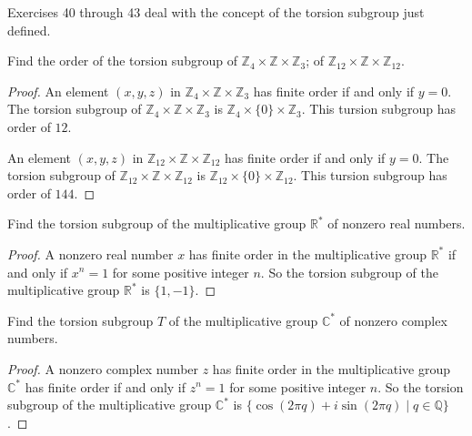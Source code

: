Exercises 40 through 43 deal with the concept of the torsion subgroup just defined.

\begin{exercise}
    Find the order of the torsion subgroup of $\mathbb{Z}_{4} \times \mathbb{Z} \times \mathbb{Z}_{3}$; of $\mathbb{Z}_{12} \times \mathbb{Z} \times \mathbb{Z}_{12}$.
\end{exercise}

\begin{proof}
    An element $(x, y, z)$ in $\mathbb{Z}_{4} \times \mathbb{Z} \times \mathbb{Z}_{3}$ has finite order if and only if $y = 0$. The torsion subgroup of $\mathbb{Z}_{4} \times \mathbb{Z} \times \mathbb{Z}_{3}$ is $\mathbb{Z}_{4} \times \{0\} \times \mathbb{Z}_{3}$. This tursion subgroup has order of $12$.

    An element $(x, y, z)$ in $\mathbb{Z}_{12} \times \mathbb{Z} \times \mathbb{Z}_{12}$ has finite order if and only if $y = 0$. The torsion subgroup of $\mathbb{Z}_{12} \times \mathbb{Z} \times \mathbb{Z}_{12}$ is $\mathbb{Z}_{12} \times \{0\} \times \mathbb{Z}_{12}$. This tursion subgroup has order of $144$.
\end{proof}

\begin{exercise}
    Find the torsion subgroup of the multiplicative group $\mathbb{R}^{*}$ of nonzero real numbers.
\end{exercise}

\begin{proof}
    A nonzero real number $x$ has finite order in the multiplicative group $\mathbb{R}^{*}$ if and only if $x^{n} = 1$ for some positive integer $n$. So the torsion subgroup of the multiplicative group $\mathbb{R}^{*}$ is $\{ 1, -1 \}$.
\end{proof}

\begin{exercise}
    Find the torsion subgroup $T$ of the multiplicative group $\mathbb{C}^{*}$ of nonzero complex numbers.
\end{exercise}

\begin{proof}
    A nonzero complex number $z$ has finite order in the multiplicative group $\mathbb{C}^{*}$ has finite order if and only if $z^{n} = 1$ for some positive integer $n$. So the torsion subgroup of the multiplicative group $\mathbb{C}^{*}$ is $\{ \cos(2\pi q) + i\sin(2\pi q) \mid q\in\mathbb{Q} \}$.
\end{proof}

